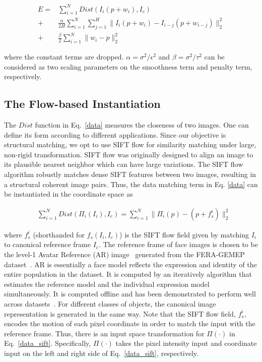 \documentclass[10pt,journal]{IEEEtran}
\begin{document}
\begin{align}
\label{data}
E = &\sum_{i=1}^{N}Dist(I_i(p+w_i),I_c) \\
\label{smooth}
	+ &\frac{\alpha}{2H}\sum_{i=1}^{N}\sum_{j=1}^{H}\parallel{I_i(p+w_i)-I_{i-j}(p+w_{i-j})}\parallel_2^2 \\
\label{penalty}
	+ &\frac{\beta}{2}\sum_{i=1}^{N}\parallel{w_i-p}\parallel_2^2
\end{align}


\noindent where the constant terms are dropped. $\alpha=\sigma^2 / \epsilon^2$ and $\beta=\sigma^2 / \tau^2$ can be considered as two scaling parameters on the smoothness term and penalty term, respectively. 

\subsection{\label{sec:model}The Flow-based Instantiation}

The $Dist$ function in Eq.~\ref{data} measures the closeness of two images. One can define its form according to different applications. Since our objective is structural matching, we opt to use SIFT flow \cite{Liu_PAMI11} for similarity matching under large, non-rigid transformation. SIFT flow \cite{Liu_PAMI11} was originally designed to align an image to its plausible nearest neighbor which can have large variations. The SIFT flow algorithm robustly matches dense SIFT features \cite{SIFT} between two images, resulting in a structural coherent image pairs. Thus, the data matching term in Eq. \ref{data} can be instantiated in the coordinate space as

\begin{align}
\label{data_sift}
&\sum_{i=1}^{N}Dist(\Pi_i(I_i),I_c)=\sum_{i=1}^{N}\parallel{\Pi_i(p)-(p+f_s^i)}\parallel_2^2
\end{align}

\noindent where $f_s^i$ (shorthanded for $f_s(I_i,I_c)$) is the SIFT flow field given by matching $I_i$ to canonical reference frame $I_c$. \textcolor[rgb]{1,0,0}{The reference frame of face images is chosen to be the level-1 Avatar Reference (AR) image~\cite{Yang_SMCB12} generated from the FERA-GEMEP dataset~\cite{Valstar_FERA11}. AR is essentially a face model reflects the expression and identity of the entire population in the dataset. It is computed by an iteratively algorithm that estimates the reference model and the individual expression model simultaneously. It is computed offline and has been demonstrated to perform well across datasets~\cite{Yang_SMCB12}. For different classes of objects, the canonical image representation is generated in the same way. Note that the SIFT flow field, $f_s^i$, encodes the motion of each pixel coordinate in order to match the input with the reference frame. Thus, there is an input space transformation for $\Pi(\cdot)$ in Eq.~\ref{data_sift}. Specifically, $\Pi(\cdot)$ takes the pixel intensity input and coordinate input on the left and right side of Eq.~\ref{data_sift}, respectively.}
\end{document}
